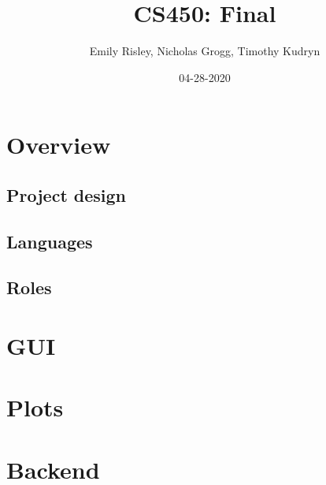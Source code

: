 \documentclass{article}
\title{CS450: Final }
\author{Emily Risley, Nicholas Grogg, Timothy Kudryn}
\date{04-28-2020}
\begin{document}
\maketitle

\section{Overview}

\subsection{Project design}

\subsection{Languages}

\subsection{Roles}

\section{GUI}

\section{Plots}

\section{Backend}
\end{document}
